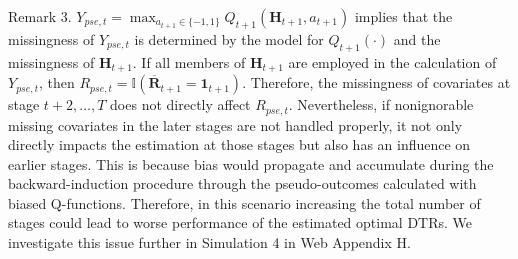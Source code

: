 \documentclass[12pt]{article}
\begin{document}
Remark 3.
$Y_{pse,t}=\max_{a_{t+1}\in \{-1,1\}} Q_{t+1}(\bm{H}_{t+1},a_{t+1})$ implies that 
the missingness of $Y_{pse,t}$ is determined by the model for $Q_{t+1}(\cdot)$ and the missingness of $\bm{H}_{t+1}$.
If all members of $\bm{H}_{t+1}$ are employed in the calculation of $Y_{pse,t}$, then $R_{pse,t} = \mathbb{I}(\overline{\bm{R}}_{t+1} = \bm{1}_{t+1} )$. Therefore, the missingness of covariates at stage $t+2, \ldots, T$ does not directly affect $R_{pse,t}$. Nevertheless, if nonignorable missing covariates in the later stages are not handled properly, it not only directly impacts the estimation at those stages but also has an influence on earlier stages. This is because bias would propagate and accumulate during the backward-induction procedure through the pseudo-outcomes calculated with biased Q-functions. 
Therefore, in this scenario increasing the total number of stages could lead to worse performance of the estimated optimal DTRs. 
We investigate this issue further in Simulation 4  in Web Appendix H.



\end{document}
